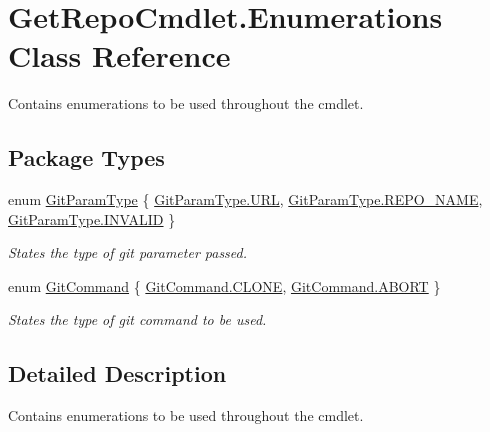 \hypertarget{class_get_repo_cmdlet_1_1_enumerations}{}\section{Get\+Repo\+Cmdlet.\+Enumerations Class Reference}
\label{class_get_repo_cmdlet_1_1_enumerations}


Contains enumerations to be used throughout the cmdlet.  


\subsection*{Package Types}
\begin{DoxyCompactItemize}
\item 
enum \mbox{\hyperlink{class_get_repo_cmdlet_1_1_enumerations_a8fa407a55382930bb57b853b36448801}{Git\+Param\+Type}} \{ \mbox{\hyperlink{class_get_repo_cmdlet_1_1_enumerations_a8fa407a55382930bb57b853b36448801ae6b391a8d2c4d45902a23a8b6585703d}{Git\+Param\+Type.\+U\+RL}}, 
\mbox{\hyperlink{class_get_repo_cmdlet_1_1_enumerations_a8fa407a55382930bb57b853b36448801a4852135c419d5b016ebf5b7110fe56b8}{Git\+Param\+Type.\+R\+E\+P\+O\+\_\+\+N\+A\+ME}}, 
\mbox{\hyperlink{class_get_repo_cmdlet_1_1_enumerations_a8fa407a55382930bb57b853b36448801accc0377a8afbf50e7094f5c23a8af223}{Git\+Param\+Type.\+I\+N\+V\+A\+L\+ID}}
 \}
\begin{DoxyCompactList}\small\item\em States the type of git parameter passed. \end{DoxyCompactList}\item 
enum \mbox{\hyperlink{class_get_repo_cmdlet_1_1_enumerations_a52683b5a6aca649a73b7bc9a076cc747}{Git\+Command}} \{ \mbox{\hyperlink{class_get_repo_cmdlet_1_1_enumerations_a52683b5a6aca649a73b7bc9a076cc747aa6ddc0995d7b58e0302675f581845cce}{Git\+Command.\+C\+L\+O\+NE}}, 
\mbox{\hyperlink{class_get_repo_cmdlet_1_1_enumerations_a52683b5a6aca649a73b7bc9a076cc747a8d12a2ca7e5a64036d7251a3eda51a38}{Git\+Command.\+A\+B\+O\+RT}}
 \}
\begin{DoxyCompactList}\small\item\em States the type of git command to be used. \end{DoxyCompactList}\end{DoxyCompactItemize}


\subsection{Detailed Description}
Contains enumerations to be used throughout the cmdlet. 



